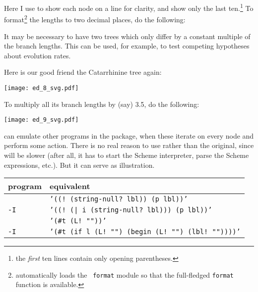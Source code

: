 \noindent{}Here I use \nwindent{} to show each node on a line for clarity, and
show only the last ten.\footnote{the \emph{first} ten lines contain only
opening parentheses.} To format\footnote{\sched{} automatically loads the {\tt
format} module so that the full-fledged {\tt format} function is available.}
the lengths to two decimal places, do the following:


\begin{samepage}

\end{samepage}

\begin{samepage}

It may be necessary to have two trees which only differ by a constant multiple
of the branch lengths. This can be used, for example, to test competing
hypotheses about evolution rates.
\end{samepage}
Here is our good friend the Catarrhinine tree again:


\begin{center}
\texttt{[image: ed\_8\_svg.pdf]}
\end{center}

To multiply all its branch lengths by (say) 3.5, do the following:


\begin{center}
\texttt{[image: ed\_9\_svg.pdf]}
\end{center}

\begin{samepage}

\noindent{}\sched{} can emulate other programs in the package, when these
iterate on every node and perform some action. There is no real reason to use
\sched{} rather than the original, since \sched{} will be slower (after all, it
has to start the Scheme interpreter, parse the Scheme expressions, etc.). But it
can serve as illustration.
\end{samepage}

\begin{center}
\begin{tabular}{ll}
program & \sched{} equivalent \\
\hline
{}{} 						& {\tt '((! (string-null? lbl)) (p lbl))'}  \\
{} {\tt -I} 		& {\tt '((! (| i (string-null? lbl))) (p lbl))'} \\
\topology{}						& {\tt '(\#t (L! ""))'} \\
\topology{} {\tt -I} 	& {\tt '(\#t (if l (L! "") (begin (L! "") (lbl!  ""))))'}
\end{tabular}
\end{center}

